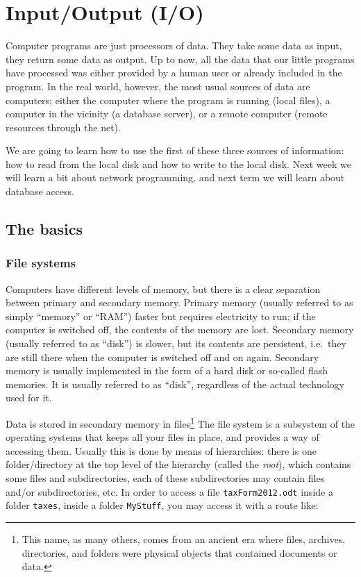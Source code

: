 
\section{Input/Output (I/O)}
\label{sec:inputoutput-io}

Computer programs are just processors of data. They take some data as
input, they return some data as output. Up to now, all the data that
our little programs have processed was either provided by a human user
or already included in the program. In the real world, however, the
most usual sources of data are computers; either the computer where
the program is running (local files), a computer in the vicinity (a
database server), or a remote computer (remote resources through the
net). 

We are going to learn how to use the first of these three sources
of information: how to read from the local disk and how to write to
the local disk. 
%
Next week we will learn a bit about network programming, and next term
we will learn about database access. 

\subsection{The basics}
\label{sec:basics}

\subsubsection{File systems}
\label{sec:filesystems}

Computers have different levels of memory, but there is a clear
separation between primary and secondary memory. Primary memory
(usually referred to as simply ``memory'' or ``RAM'')
faster but requires electricity to run; if the computer is switched
off, the contents of the memory are lost. Secondary memory (usually
referred to as ``disk'') is slower,
but its contents are persistent, i.e.~they are still there when the
computer is switched off and on again. Secondary memory is usually
implemented in the form of a hard disk or so-called flash
memories. It is usually referred to as ``disk'', regardless of the
actual technology used for it. 

Data is stored in secondary memory in files\footnote{This name, as
  many others, comes from an ancient era where files, archives,
  directories, and folders were physical objects that contained
  documents or data.}  
The file system is a subsystem of the operating
systems that keeps all your files in place, and provides a way of
accessing them. Usually this is done by means of hierarchies: there is
one folder/directory at the top level of the hierarchy (called the
\emph{root}), which contains some files and subdirectories, each of
these subdirectories may contain files and/or subdirectories, etc. In
order to access a file \verb+taxForm2012.odt+ inside a folder
\verb+taxes+, inside a folder \verb+MyStuff+, you may access it with a
route like: 

